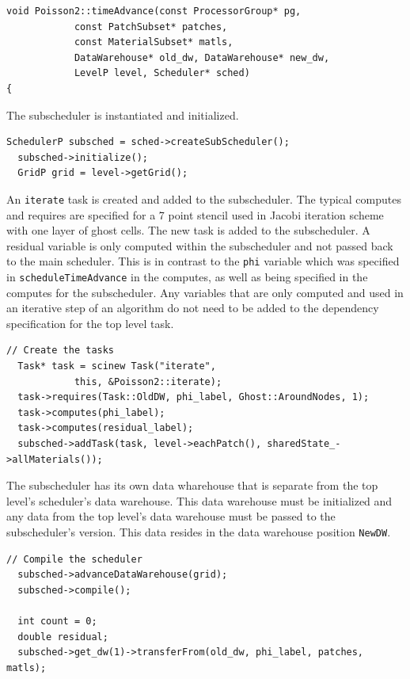\documentclass[12pt]{report}
\begin{document}
\begin{Verbatim}[fontsize=\footnotesize]
void Poisson2::timeAdvance(const ProcessorGroup* pg,
			const PatchSubset* patches,
			const MaterialSubset* matls,
			DataWarehouse* old_dw, DataWarehouse* new_dw,
			LevelP level, Scheduler* sched)
{

\end{Verbatim}

The subscheduler is instantiated and initialized. 

\begin{Verbatim}[fontsize=\footnotesize]
  SchedulerP subsched = sched->createSubScheduler();
  subsched->initialize();
  GridP grid = level->getGrid();
\end{Verbatim}

An \texttt{iterate} task is created and added to the subscheduler.
The typical computes and requires are specified for a 7 point stencil
used in Jacobi iteration scheme with one layer of ghost cells.  The
new task is added to the subscheduler.  A residual variable is only
computed within the subscheduler and not passed back to the main
scheduler.  This is in contrast to the \texttt{phi} variable which was
specified in \texttt{scheduleTimeAdvance} in the computes, as well as
being specified in the computes for the subscheduler.  Any variables
that are only computed and used in an iterative step of an algorithm
do not need to be added to the dependency specification for the top
level task.

\begin{Verbatim}[fontsize=\footnotesize]
  // Create the tasks
  Task* task = scinew Task("iterate",
			this, &Poisson2::iterate);
  task->requires(Task::OldDW, phi_label, Ghost::AroundNodes, 1);
  task->computes(phi_label);
  task->computes(residual_label);
  subsched->addTask(task, level->eachPatch(), sharedState_->allMaterials());
\end{Verbatim}

The subscheduler has its own data wharehouse that is separate from the
top level's scheduler's data warehouse.  This data warehouse must be
initialized and any data from the top level's data warehouse must be
passed to the subscheduler's version.  This data resides in the data
warehouse position \texttt{NewDW}.

\begin{Verbatim}[fontsize=\footnotesize]
  // Compile the scheduler
  subsched->advanceDataWarehouse(grid);
  subsched->compile();

  int count = 0;
  double residual;
  subsched->get_dw(1)->transferFrom(old_dw, phi_label, patches, matls);
\end{Verbatim}
\end{document}

